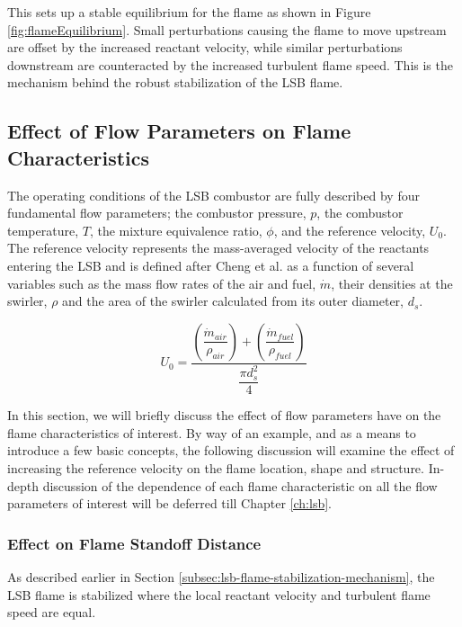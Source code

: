 This sets up a stable equilibrium for the flame as shown in Figure \ref{fig:flameEquilibrium}.
Small perturbations causing the flame to move upstream are offset by the increased reactant velocity, while similar perturbations downstream are counteracted by the increased turbulent flame speed.
This is the mechanism behind the robust stabilization of the LSB flame.

\subsection{Effect of Flow Parameters on Flame Characteristics}

The operating conditions of the LSB combustor are fully described by four fundamental flow parameters; the combustor pressure, \(p\), the combustor temperature, \(T\), the mixture equivalence ratio, \(\phi\), and the reference velocity, \(U_0\).
The reference velocity represents the mass-averaged velocity of the reactants entering the LSB and is defined after Cheng et al.\cite{2000-cheng} as a function of several variables such as the mass flow rates of the air and fuel, \(\dot{m}\), their densities at the swirler, \(\rho\) and the area of the swirler calculated from its outer diameter, \(d_s\).

\begin{equation}
U_0 = \frac{ \left( \dfrac{ \dot{m}_{air} }{ \rho_{air} } \right) + \left( \dfrac{ \dot{m}_{fuel} }{ \rho_{fuel} }\right) }{ \dfrac{\pi d_s^2 }{4} }
\label{eqn:referenceVelocity}
\end{equation}

In this section, we will briefly discuss the effect of flow parameters have on the flame characteristics of interest.
By way of an example, and as a means to introduce a few basic concepts, the following discussion will examine the effect of increasing the reference velocity on the flame location, shape and structure.
In-depth discussion of the dependence of each flame characteristic on all the flow parameters of interest will be deferred till Chapter \ref{ch:lsb}.

\subsubsection{Effect on Flame Standoff Distance}
\label{subsubsec:flame-characteristics-standoff}

As described earlier in Section \ref{subsec:lsb-flame-stabilization-mechanism}, the LSB flame is stabilized where the local reactant velocity and turbulent flame speed are equal.

